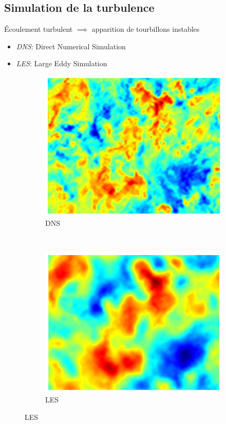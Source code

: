 \documentclass{beamer}
\begin{document}
\subsection{Simulation de la turbulence}
\begin{frame}
  Écoulement turbulent $\implies$ apparition de tourbillons instables
  \begin{itemize}
  \item \textit{DNS}: Direct Numerical Simulation
  \item \textit{LES}: Large Eddy Simulation
  \end{itemize}

  \begin{figure}[ht]
  \centering
  \begin{subfigure}[b]{0.5\textwidth}
    \centering
    \includegraphics[scale=0.25]{figures/DNS_Velocity_Field.png}
    \caption{\label{fig:dns} DNS}
  \end{subfigure}%
  ~
  \begin{subfigure}[b]{0.5\textwidth}
    \centering
    \includegraphics[scale=0.25]{figures/DNS_Filtered_Velocity_Field_Large.png}
    \caption{\label{fig:les} LES}
  \end{subfigure}
\end{figure}
\end{frame}
\end{document}
